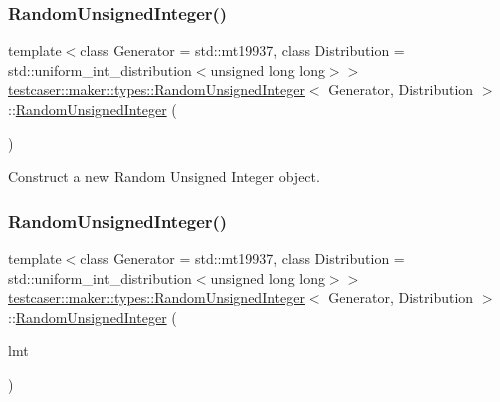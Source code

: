 \subsubsection{\texorpdfstring{RandomUnsignedInteger()}{RandomUnsignedInteger()}\hspace{0.1cm}{\footnotesize\ttfamily [1/3]}}
{\footnotesize\ttfamily template$<$class Generator = std\+::mt19937, class Distribution = std\+::uniform\+\_\+int\+\_\+distribution$<$unsigned long long$>$$>$ \\
\mbox{\hyperlink{classtestcaser_1_1maker_1_1types_1_1RandomUnsignedInteger}{testcaser\+::maker\+::types\+::\+Random\+Unsigned\+Integer}}$<$ Generator, Distribution $>$\+::\mbox{\hyperlink{classtestcaser_1_1maker_1_1types_1_1RandomUnsignedInteger}{Random\+Unsigned\+Integer}} (\begin{DoxyParamCaption}{ }\end{DoxyParamCaption})\hspace{0.3cm}{\ttfamily [inline]}}



Construct a new Random Unsigned Integer object. 

\mbox{\label{classtestcaser_1_1maker_1_1types_1_1RandomUnsignedInteger_a9f4184392f1842553d062f2d0f668ae2}} 
\subsubsection{\texorpdfstring{RandomUnsignedInteger()}{RandomUnsignedInteger()}\hspace{0.1cm}{\footnotesize\ttfamily [2/3]}}
{\footnotesize\ttfamily template$<$class Generator = std\+::mt19937, class Distribution = std\+::uniform\+\_\+int\+\_\+distribution$<$unsigned long long$>$$>$ \\
\mbox{\hyperlink{classtestcaser_1_1maker_1_1types_1_1RandomUnsignedInteger}{testcaser\+::maker\+::types\+::\+Random\+Unsigned\+Integer}}$<$ Generator, Distribution $>$\+::\mbox{\hyperlink{classtestcaser_1_1maker_1_1types_1_1RandomUnsignedInteger}{Random\+Unsigned\+Integer}} (\begin{DoxyParamCaption}\item[{\mbox{\hyperlink{classtestcaser_1_1maker_1_1RandomUnsignedIntegerLimit}{testcaser\+::maker\+::\+Random\+Unsigned\+Integer\+Limit}}}]{lmt }\end{DoxyParamCaption})\hspace{0.3cm}{\ttfamily [inline]}}



